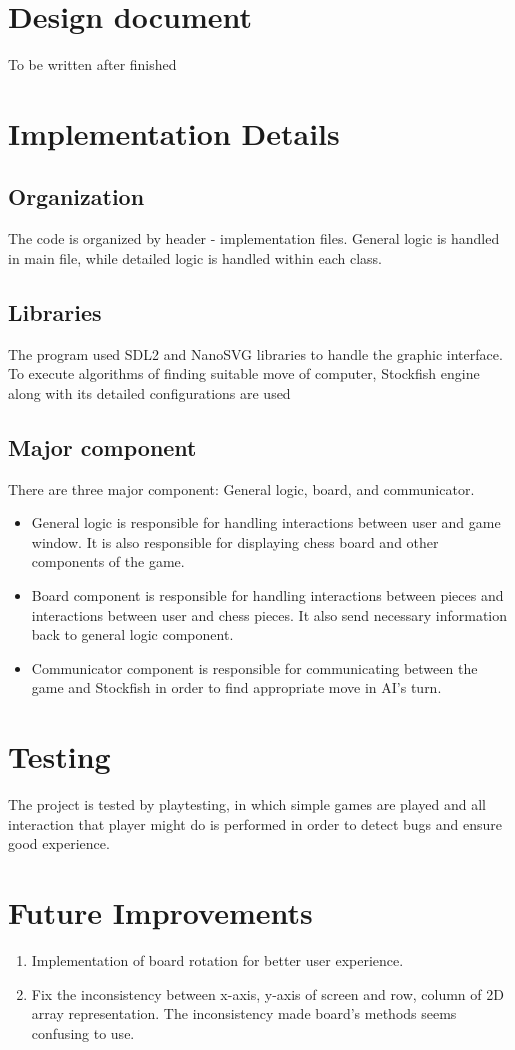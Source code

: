 \documentclass[a4paper, 10pt, titlepage]{report}
\begin{document}
\chapter{Design document}
To be written after finished
\chapter{Implementation Details}
\section{Organization}
The code is organized by header - implementation files. General logic is handled in main file, while detailed logic is handled within each class. 
\section{Libraries}
The program used SDL2 and NanoSVG libraries to handle the graphic interface. To execute algorithms of finding suitable move of computer, Stockfish engine along with its detailed configurations are used
\section{Major component}
There are three major component: General logic, board, and communicator. 
\begin{itemize}
    \item General logic is responsible for handling interactions between user and game window. It is also responsible for displaying chess board and other components of the game.
    \item Board component is responsible for handling interactions between pieces and interactions between user and chess pieces. It also send necessary information back to general logic component.
    \item Communicator component is responsible for communicating between the game and Stockfish in order to find appropriate move in AI's turn.
\end{itemize}
\chapter{Testing}

The project is tested by playtesting, in which simple games are played and all interaction that player might do is performed in order to detect bugs and ensure good experience.
\chapter{Future Improvements}
\begin{enumerate}
    \item Implementation of board rotation for better user experience.
    \item Fix the inconsistency between x-axis, y-axis of screen and row, column of 2D array representation. The inconsistency made board's methods seems confusing to use.
\end{enumerate}
\end{document}
